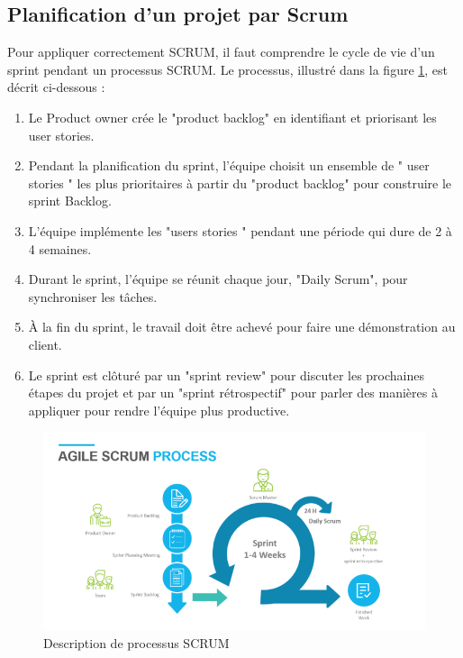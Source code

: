 \subsection[Planification d’un projet par Scrum]{Planification d’un projet par Scrum}
Pour appliquer correctement SCRUM, il faut comprendre le cycle de vie d’un sprint pendant un processus SCRUM. Le processus, illustré dans la figure \ref{fig:scrum}, est décrit ci-dessous : 
\begin{enumerate}[label=\arabic*.]
	\item Le Product owner crée le "product backlog" en identifiant et priorisant les user stories.
	\item Pendant la planification du sprint, l’équipe choisit un ensemble de " user stories " les plus prioritaires à partir du "product backlog" pour construire le sprint Backlog. 
	\item L’équipe implémente les "users stories " pendant une période qui dure de 2 à 4 semaines. 
	\item Durant le sprint, l’équipe se réunit chaque jour, "Daily Scrum", pour synchroniser les tâches. 
	\item À la fin du sprint, le travail doit être achevé pour faire une démonstration au client. 
	\item Le sprint est clôturé par un "sprint review" pour discuter les prochaines étapes du projet et par un "sprint rétrospectif" pour parler des manières à appliquer pour rendre l’équipe plus productive.
\end{enumerate}
\begin{figure}[H]
	\centering
	\includegraphics[width=0.9\linewidth]{img/scrum}
	\caption[Description de processus SCRUM]{Description de processus SCRUM}
	\label{fig:scrum}
\end{figure}
